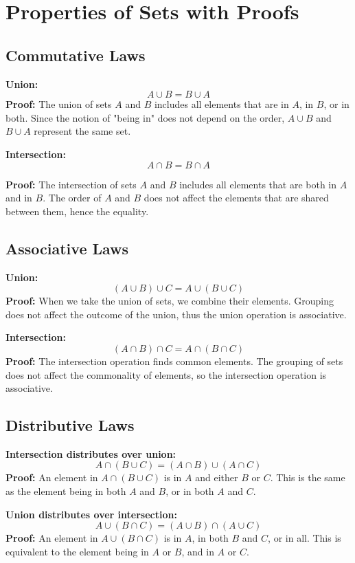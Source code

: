 \documentclass[
	12pt, %
	fleqn, %
	a4paper, %
]{LegrandOrangeBook}
\begin{document}
\section{Properties of Sets with Proofs}

\subsection*{Commutative Laws}
\textbf{Union:}
\[
A \cup B = B \cup A
\]
\textbf{Proof:} 
The union of sets \( A \) and \( B \) includes all elements that are in \( A \), in \( B \), or in both. Since the notion of "being in" does not depend on the order, \( A \cup B \) and \( B \cup A \) represent the same set.

\noindent\textbf{Intersection:}
$$A \cap B = B \cap A$$


\textbf{Proof:} 
The intersection of sets \( A \) and \( B \) includes all elements that are both in \( A \) and in \( B \). The order of \( A \) and \( B \) does not affect the elements that are shared between them, hence the equality.

\subsection*{Associative Laws}
\textbf{Union:}
\[
(A \cup B) \cup C = A \cup (B \cup C)
\]
\textbf{Proof:} 
When we take the union of sets, we combine their elements. Grouping does not affect the outcome of the union, thus the union operation is associative.

\textbf{Intersection:}
\[
(A \cap B) \cap C = A \cap (B \cap C)
\]
\textbf{Proof:} 
The intersection operation finds common elements. The grouping of sets does not affect the commonality of elements, so the intersection operation is associative.

\subsection*{Distributive Laws}
\textbf{Intersection distributes over union:}
\[
A \cap (B \cup C) = (A \cap B) \cup (A \cap C)
\]
\textbf{Proof:} 
An element in \( A \cap (B \cup C) \) is in \( A \) and either \( B \) or \( C \). This is the same as the element being in both \( A \) and \( B \), or in both \( A \) and \( C \).

\textbf{Union distributes over intersection:}
\[
A \cup (B \cap C) = (A \cup B) \cap (A \cup C)
\]
\textbf{Proof:} 
An element in \( A \cup (B \cap C) \) is in \( A \), in both \( B \) and \( C \), or in all. This is equivalent to the element being in \( A \) or \( B \), and in \( A \) or \( C \).
\end{document}
